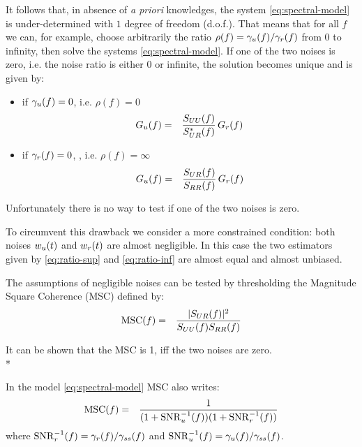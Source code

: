 It follows that, in absence of {\it a priori} knowledges,  the system \eqref{eq:spectral-model} is under-determined with $1$ degree of freedom (d.o.f.). That means that for all $f$ we can, for example,  choose arbitrarily the ratio $\rho(f)=\gamma_{{u}}(f)/\gamma_{{r}}(f)$ from $0$ to infinity, then solve the systems \eqref{eq:spectral-model}. If one of the two noises is zero, i.e. the noise ratio is either 0 or infinite, the solution becomes unique and is given by:
\begin{itemize}
\item
if $\gamma_{{u}}(f)=0$, i.e. $\rho(f)=0$
\begin{eqnarray}
\label{eq:ratio-sup}
G_{{u}}(f)&=&
\frac{S_{UU}(f)}{S_{UR}^*(f)}\,G_{{r}}(f)
\end{eqnarray}
\item
if $\gamma_{{r}}(f)=0$, , i.e. $\rho(f)=\infty$
\begin{eqnarray}
\label{eq:ratio-inf}
G_{{u}}(f)&=&
\frac{S_{UR}(f)}{S_{RR}(f)}\,G_{{r}}(f)
\end{eqnarray}
\end{itemize}
 Unfortunately there is no way to test if one of the two noises is zero.


To circumvent this drawback we consider a more constrained condition: both noises $w_{{u}}(t)$ and $w_{{r}}(t)$ are almost negligible. In this case the two estimators given by \eqref{eq:ratio-sup} and \eqref{eq:ratio-inf} are almost equal and almost unbiased. 

The assumptions of negligible noises can be tested by thresholding the Magnitude Square Coherence (MSC) defined by:
\begin{eqnarray}
 \label{eq:MSC-continuous-frequency}
 \mathrm{MSC}(f) &=& \frac{|S_{UR}(f)|^{2}}{S_{UU}(f)S_{RR}(f)}
\end{eqnarray}
 
It can be shown that the MSC is 1, iff the two noises are zero.\\*

In the model \eqref{eq:spectral-model} MSC also writes:
\begin{eqnarray}
\label{eq:coherence-in-our-model}
 \mathrm{MSC}(f) &=& \frac{1}{(1+\mathrm{SNR}^{-1}_{{u}}(f))(1+\mathrm{SNR}^{-1}_{{r}}(f))}
\end{eqnarray}
where $\mathrm{SNR}^{-1}_{{r}}(f)=\gamma_{{r}}(f)/\gamma_{ss}(f)$ and $\mathrm{SNR}^{-1}_{{u}}(f)=\gamma_{{u}}(f)/\gamma_{ss}(f)$.

